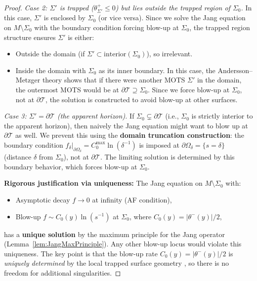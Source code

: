\begin{proof}
\textit{Case 2: $\Sigma'$ is trapped ($\theta^+_{\Sigma'} \le 0$) but lies outside the trapped region of $\Sigma_0$.} In this case, $\Sigma'$ is enclosed by $\Sigma_0$ (or vice versa). Since we solve the Jang equation on $M \setminus \Sigma_0$ with the boundary condition forcing blow-up at $\Sigma_0$, the trapped region structure ensures $\Sigma'$ is either:
\begin{itemize}
    \item Outside the domain (if $\Sigma' \subset \text{interior}(\Sigma_0)$), so irrelevant.
    \item Inside the domain with $\Sigma_0$ as its inner boundary. In this case, the Andersson--Metzger theory \cite{anderssonmetzger2009} shows that if there were another MOTS $\Sigma'$ in the domain, the outermost MOTS would be at $\partial\mathcal{T} \supseteq \Sigma_0$. Since we force blow-up at $\Sigma_0$, not at $\partial\mathcal{T}$, the solution is constructed to avoid blow-up at other surfaces.
\end{itemize}

\textit{Case 3: $\Sigma' = \partial\mathcal{T}$ (the apparent horizon).} If $\Sigma_0 \subsetneq \partial\mathcal{T}$ (i.e., $\Sigma_0$ is strictly interior to the apparent horizon), then naively the Jang equation might want to blow up at $\partial\mathcal{T}$ as well. We prevent this using the \textbf{domain truncation construction}: the boundary condition $f_\delta|_{\partial\Omega_\delta} = C_0^{\max}\ln(\delta^{-1})$ is imposed at $\partial\Omega_\delta = \{s = \delta\}$ (distance $\delta$ from $\Sigma_0$), not at $\partial\mathcal{T}$. The limiting solution is determined by this boundary behavior, which forces blow-up at $\Sigma_0$.

\textbf{Rigorous justification via uniqueness:} The Jang equation on $M \setminus \Sigma_0$ with:
\begin{itemize}
    \item Asymptotic decay $f \to 0$ at infinity (AF condition),
    \item Blow-up $f \sim C_0(y) \ln(s^{-1})$ at $\Sigma_0$, where $C_0(y) = |\theta^-(y)|/2$,
\end{itemize}
has a \textbf{unique solution} by the maximum principle for the Jang operator (Lemma~\ref{lem:JangMaxPrinciple}). Any other blow-up locus would violate this uniqueness. The key point is that the blow-up rate $C_0(y) = |\theta^-(y)|/2$ is \emph{uniquely determined} by the local trapped surface geometry \cite[Prop.~4.5]{hankhuri2013}, so there is no freedom for additional singularities.


\end{proof}
